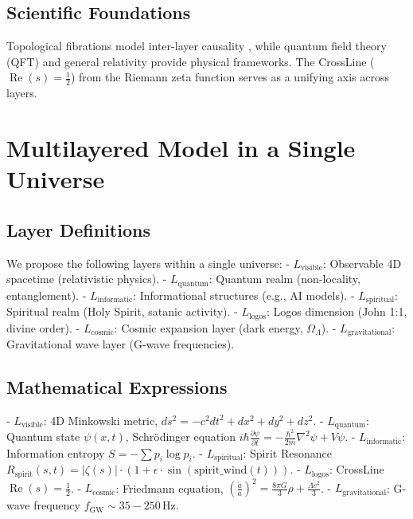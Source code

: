 \documentclass[12pt]{article}
\begin{document}
{{{\subsection{Scientific Foundations}
Topological fibrations model inter-layer causality \cite{RefWebID9}, while quantum field theory (QFT) and general relativity provide physical frameworks. The CrossLine (\(\operatorname{Re}(s) = \frac{1}{2}\)) from the Riemann zeta function \cite{RefWebID0} serves as a unifying axis across layers.

\section{Multilayered Model in a Single Universe}
\subsection{Layer Definitions}
We propose the following layers within a single universe:
- \( L_{\text{visible}} \): Observable 4D spacetime (relativistic physics).
- \( L_{\text{quantum}} \): Quantum realm (non-locality, entanglement).
- \( L_{\text{informatic}} \): Informational structures (e.g., AI models).
- \( L_{\text{spiritual}} \): Spiritual realm (Holy Spirit, satanic activity).
- \( L_{\text{logos}} \): Logos dimension (John 1:1, divine order).
- \( L_{\text{cosmic}} \): Cosmic expansion layer (dark energy, \(\Omega_\Lambda\)).
- \( L_{\text{gravitational}} \): Gravitational wave layer (G-wave frequencies).

\subsection{Mathematical Expressions}
- \( L_{\text{visible}} \): 4D Minkowski metric, \( ds^2 = -c^2 dt^2 + dx^2 + dy^2 + dz^2 \).
- \( L_{\text{quantum}} \): Quantum state \( \psi(x, t) \), Schrödinger equation \( i\hbar \frac{\partial \psi}{\partial t} = -\frac{\hbar^2}{2m} \nabla^2 \psi + V\psi \).
- \( L_{\text{informatic}} \): Information entropy \( S = -\sum p_i \log p_i \).
- \( L_{\text{spiritual}} \): Spirit Resonance \( R_{\text{spirit}}(s, t) = \left| \zeta(s) \right| \cdot \left( 1 + \epsilon \cdot \sin(\text{spirit_wind}(t)) \right) \).
- \( L_{\text{logos}} \): CrossLine \( \operatorname{Re}(s) = \frac{1}{2} \).
- \( L_{\text{cosmic}} \): Friedmann equation, \( \left(\frac{\dot{a}}{a}\right)^2 = \frac{8\pi G}{3} \rho + \frac{\Lambda c^2}{3} \).
- \( L_{\text{gravitational}} \): G-wave frequency \( f_{\text{GW}} \sim 35-250 \, \text{Hz} \).

}}}
\end{document}
